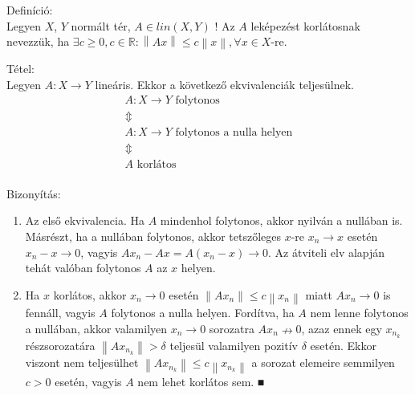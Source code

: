 \documentclass[12pt,a4paper]{scrartcl}
\providecommand{\tightlist}{%
  \setlength{\itemsep}{0pt}\setlength{\parskip}{0pt}}
\newenvironment{definicio}{}{}
\newenvironment{tetel}{}{}
\newenvironment{bizonyitas}{}{}
\begin{document}
\begin{definicio}

Definíció:\\
Legyen \(X\), \(Y\) normált tér, \(A \in {lin}\left( {X,Y} \right)\) !
Az \(A\) leképezést korlátosnak nevezzük, ha
\(\exists c \geq 0,c \in {\mathbb{R}}:\left\| {Ax} \right\| \leq c\left\| x \right\|,\forall x \in X\)-re.

\end{definicio}

\begin{tetel}

Tétel:\\
Legyen \(\left. A:X\rightarrow Y \right.\) lineáris. Ekkor a következő
ekvivalenciák teljesülnek. \[\begin{gathered}
  A:X \to Y{\text{ folytonos}} \\ 
   \Updownarrow  \\ 
  A:X \to Y{\text{ folytonos a nulla helyen}} \\ 
   \Updownarrow  \\ 
  A{\text{ korlátos}} \\ 
\end{gathered} \]

\end{tetel}

\begin{bizonyitas}

Bizonyítás:

\begin{enumerate}
\def\labelenumi{\arabic{enumi}.}
\tightlist
\item
  Az első ekvivalencia. Ha \(A\) mindenhol folytonos, akkor nyilván a
  nullában is. Másrészt, ha a nullában folytonos, akkor tetszőleges
  \(x\)-re \(\left. x_{n}\rightarrow x \right.\) esetén
  \(\left. x_{n} - x\rightarrow 0 \right.\), vagyis
  \(\left. Ax_{n} - Ax = A\left( {x_{n} - x} \right)\rightarrow 0 \right.\).
  Az átviteli elv alapján tehát valóban folytonos \(A\) az \(x\) helyen.
\item
  Ha \(x\) korlátos, akkor \(\left. x_{n}\rightarrow 0 \right.\) esetén
  \(\left\| {Ax_{n}} \right\| \leq c\left\| x_{n} \right\|\) miatt
  \(\left. Ax_{n}\rightarrow 0 \right.\) is fennáll, vagyis \(A\)
  folytonos a nulla helyen. Fordítva, ha \(A\) nem lenne folytonos a
  nullában, akkor valamilyen \(\left. x_{n}\rightarrow 0 \right.\)
  sorozatra \(Ax_{n}\nrightarrow 0\), azaz ennek egy \(x_{n_{k}}\)
  részsorozatára \(\left\| {Ax_{n_{k}}} \right\| > \delta\) teljesül
  valamilyen pozitív \(\delta\) esetén. Ekkor viszont nem teljesülhet
  \(\left\| {Ax_{n_{k}}} \right\| \leq c\left\| x_{n_{k}} \right\|\) a
  sorozat elemeire semmilyen \(c > 0\) esetén, vagyis \(A\) nem lehet
  korlátos sem. ■
\end{enumerate}

\end{bizonyitas}
\end{document}

